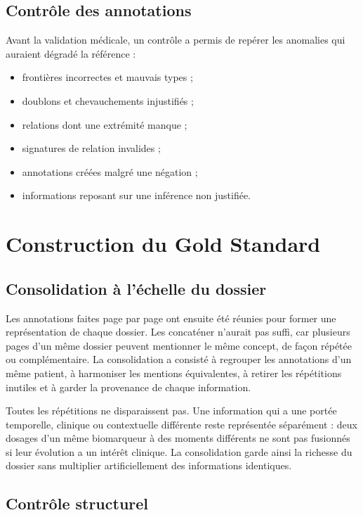 \subsection{Contrôle des annotations}\label{sec:c3-3-7-5}

Avant la validation médicale, un contrôle a permis de repérer les anomalies qui auraient dégradé la référence :

\begin{itemize}
  \item frontières incorrectes et mauvais types ;
  \item doublons et chevauchements injustifiés ;
  \item relations dont une extrémité manque ;
  \item signatures de relation invalides ;
  \item annotations créées malgré une négation ;
  \item informations reposant sur une inférence non justifiée.
\end{itemize}

\section{Construction du Gold Standard}\label{sec:c3-3-8}

\subsection{Consolidation à l’échelle du dossier}\label{sec:c3-3-8-1}

Les annotations faites page par page ont ensuite été réunies pour former une représentation de chaque dossier. Les concaténer n’aurait pas suffi, car plusieurs pages d’un même dossier peuvent mentionner le même concept, de façon répétée ou complémentaire. La consolidation a consisté à regrouper les annotations d’un même patient, à harmoniser les mentions équivalentes, à retirer les répétitions inutiles et à garder la provenance de chaque information.

Toutes les répétitions ne disparaissent pas. Une information qui a une portée temporelle, clinique ou contextuelle différente reste représentée séparément : deux dosages d’un même biomarqueur à des moments différents ne sont pas fusionnés si leur évolution a un intérêt clinique. La consolidation garde ainsi la richesse du dossier sans multiplier artificiellement des informations identiques.

\subsection{Contrôle structurel}\label{sec:c3-3-8-2}

